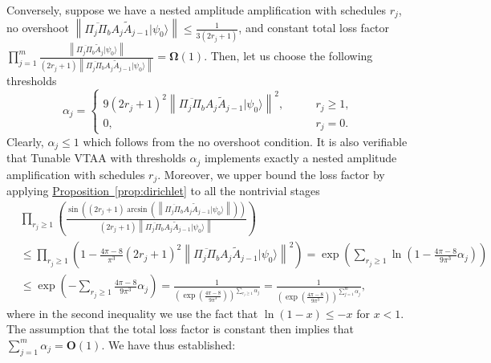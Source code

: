 \documentclass[letterpaper,onecolumn,11pt,accepted=2026-02-14]{quantumarticle}
\newcommand{\norm}[1]{\left\lVert#1\right\rVert}
\theoremstyle{remark}
\theoremstyle{plain}
\newcommand{\prop}[1]{\hyperref[prop:#1]{Proposition~\ref*{prop:#1}}}
\newcommand{\ket}[1]{|#1\rangle}
\begin{document}
Conversely, suppose we have a nested amplitude amplification with schedules $r_j$, no overshoot $\norm{\overline{\Pi_j\Pi_b}A_j\widetilde A_{j-1}\ket{\psi_0}}\leq\frac{1}{3(2r_j+1)}$, and constant total loss factor $\prod_{j=1}^m\frac{\norm{\overline{\Pi_j\Pi_b}\widetilde A_j\ket{\psi_0}}}{(2r_j+1)\norm{\overline{\Pi_j\Pi_b}A_j\widetilde A_{j-1}\ket{\psi_0}}}=\mathbf{\Omega}(1)$. Then, let us choose the following thresholds
\begin{equation}
    \alpha_j=
    \begin{cases}
        9(2r_j+1)^2\norm{\overline{\Pi_j\Pi_b}A_j\widetilde A_{j-1}\ket{\psi_0}}^2,\qquad& r_j\geq1,\\
        0,&r_j=0.
    \end{cases}
\end{equation}
Clearly, $\alpha_j\leq1$ which follows from the no overshoot condition. It is also verifiable that Tunable VTAA with thresholds $\alpha_j$ implements exactly a nested amplitude amplification with schedules $r_j$. Moreover, we upper bound the loss factor by applying \prop{dirichlet} to all the nontrivial stages
\begin{equation}
\begin{aligned}
    &\prod_{r_j\geq1}\left(\frac{\sin\left((2r_j+1)\arcsin\left(\norm{\overline{\Pi_j\Pi_b}A_j\widetilde A_{j-1}\ket{\psi_0}}\right)\right)}{(2r_j+1)\norm{\overline{\Pi_j\Pi_b}A_j\widetilde A_{j-1}\ket{\psi_0}}}\right)\\
    &\leq\prod_{r_j\geq1}\left(1-\frac{4\pi-8}{\pi^3}(2r_j+1)^2\norm{\overline{\Pi_j\Pi_b}A_j\widetilde A_{j-1}\ket{\psi_0}}^2\right)
    =\exp\left(\sum_{r_j\geq1}\ln\left(1-\frac{4\pi-8}{9\pi^3}\alpha_j\right)\right)\\
    &\leq\exp\left(-\sum_{r_j\geq1}\frac{4\pi-8}{9\pi^3}\alpha_j\right)
    =\frac{1}{\left(\exp\left(\frac{4\pi-8}{9\pi^3}\right)\right)^{\sum_{r_j\geq1}\alpha_j}}
    =\frac{1}{\left(\exp\left(\frac{4\pi-8}{9\pi^3}\right)\right)^{\sum_{j=1}^m\alpha_j}},
\end{aligned}
\end{equation}
where in the second inequality we use the fact that $\ln(1-x)\leq-x$ for $x<1$.
The assumption that the total loss factor is constant then implies that $\sum_{j=1}^m\alpha_j=\mathbf{O}(1)$. We have thus established:
\end{document}
